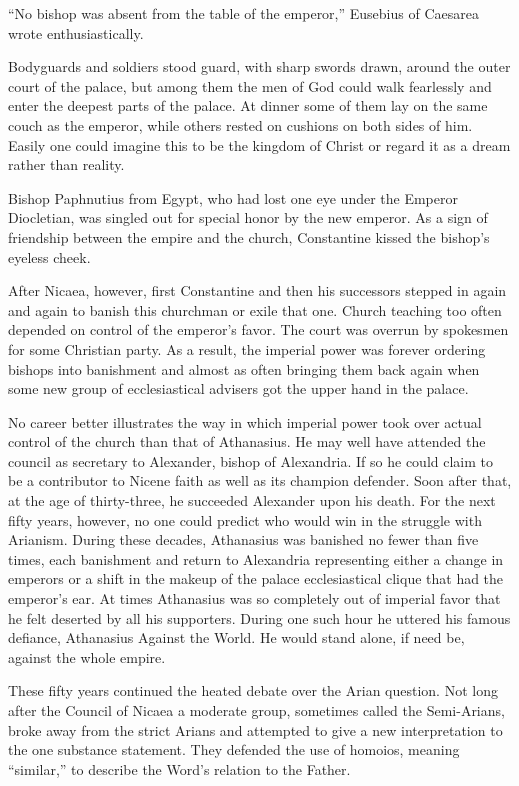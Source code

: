 “No bishop was absent from the table of the emperor,” Eusebius of Caesarea wrote enthusiastically.

\begin{blockquote}
Bodyguards and soldiers stood guard, with sharp swords drawn, around the outer court of the palace,
but among them the men of God could walk fearlessly and enter the deepest parts of the palace. At
dinner some of them lay on the same couch as the emperor, while others rested on cushions on both
sides of him. Easily one could imagine this to be the kingdom of Christ or regard it as a dream
rather than reality.
\end{blockquote}

Bishop Paphnutius from Egypt, who had lost one eye under the Emperor Diocletian, was singled out for
special honor by the new emperor. As a sign of friendship between the empire and the church,
Constantine kissed the bishop’s eyeless cheek.

After Nicaea, however, first Constantine and then his successors stepped in again and again to
banish this churchman or exile that one. Church teaching too often depended on control of the
emperor’s favor. The court was overrun by spokesmen for some Christian party. As a result, the
imperial power was forever ordering bishops into banishment and almost as often bringing them back
again when some new group of ecclesiastical advisers got the upper hand in the palace.

No career better illustrates the way in which imperial power took over actual control of the church
than that of Athanasius. He may well have attended the council as secretary to Alexander, bishop of
Alexandria. If so he could claim to be a contributor to Nicene faith as well as its champion
defender. Soon after that, at the age of thirty-three, he succeeded Alexander upon his death. For
the next fifty years, however, no one could predict who would win in the struggle with Arianism.
During these decades, Athanasius was banished no fewer than five times, each banishment and return
to Alexandria representing either a change in emperors or a shift in the makeup of the palace
ecclesiastical clique that had the emperor’s ear. At times Athanasius was so completely out of
imperial favor that he felt deserted by all his supporters. During one such hour he uttered his
famous defiance, Athanasius Against the World. He would stand alone, if need be, against the whole
empire.

These fifty years continued the heated debate over the Arian question. Not long after the Council of
Nicaea a moderate group, sometimes called the Semi-Arians, broke away from the strict Arians and
attempted to give a new interpretation to the one substance statement. They defended the use of
homoios, meaning “similar,” to describe the Word’s relation to the Father.

